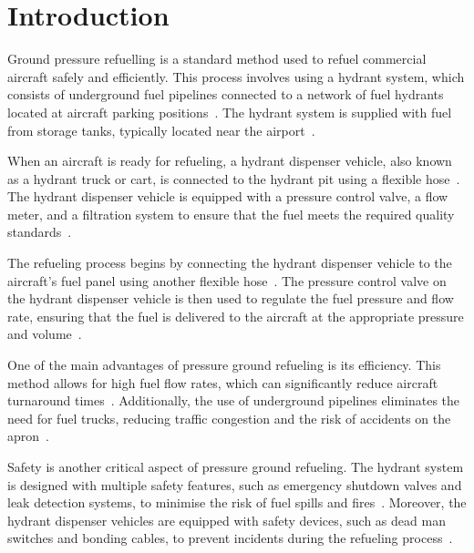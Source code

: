 \documentclass[12pt,oneside]{book} %
\begin{document}
%
%
\mainmatter\pagestyle{fancy}
\fancyhead[L]{\nouppercase{\leftmark}}
\fancyhead[R]{\nouppercase{\rightmark}}

\chapter{Introduction}
Ground pressure refuelling is a standard method used to refuel commercial
aircraft safely and efficiently. This process involves using a hydrant system,
which consists of underground fuel pipelines connected to a network of fuel
hydrants located at aircraft parking positions~\cite{blakey2011aviation}. The
hydrant system is supplied with fuel from storage tanks, typically located near
the airport~\cite{kazda2015airport}.

When an aircraft is ready for refueling, a hydrant dispenser vehicle, also
known as a hydrant truck or cart, is connected to the hydrant pit using a
flexible hose~\cite{sati2019aircraft}. The hydrant dispenser vehicle is
equipped with a pressure control valve, a flow meter, and a filtration system
to ensure that the fuel meets the required quality
standards~\cite{iata2019guidance}.

The refueling process begins by connecting the hydrant dispenser vehicle to the
aircraft's fuel panel using another flexible hose~\cite{sati2019aircraft}. The
pressure control valve on the hydrant dispenser vehicle is then used to
regulate the fuel pressure and flow rate, ensuring that the fuel is delivered
to the aircraft at the appropriate pressure and volume~\cite{iata2019guidance}.

One of the main advantages of pressure ground refueling is its efficiency. This
method allows for high fuel flow rates, which can significantly reduce aircraft
turnaround times~\cite{blakey2011aviation}. Additionally, the use of
underground pipelines eliminates the need for fuel trucks, reducing traffic
congestion and the risk of accidents on the apron~\cite{kazda2015airport}.

Safety is another critical aspect of pressure ground refueling. The hydrant
system is designed with multiple safety features, such as emergency shutdown
valves and leak detection systems, to minimise the risk of fuel spills and
fires~\cite{iata2019guidance}. Moreover, the hydrant dispenser vehicles are
equipped with safety devices, such as dead man switches and bonding cables, to
prevent incidents during the refueling process~\cite{sati2019aircraft}.
\end{document}
